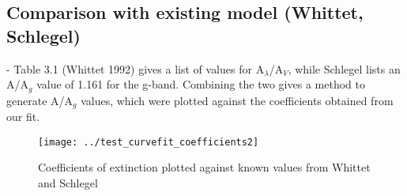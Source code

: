 \documentclass[manuscript]{aastex}
\begin{document}
\subsection{Comparison with existing model (Whittet, Schlegel)}
- Table 3.1 (Whittet 1992) gives a list of values for A$_\lambda$/A$_V$, while Schlegel lists an A/A$_g$ value of 1.161 for the g-band. Combining the two gives a method to generate A/A$_g$ values, which were plotted against the coefficients obtained from our fit.
\begin{figure}
\texttt{[image: ../test\_curvefit\_coefficients2]}\\
\caption{Coefficients of extinction plotted against known values from Whittet and Schlegel}
\end{figure}
\end{document}
